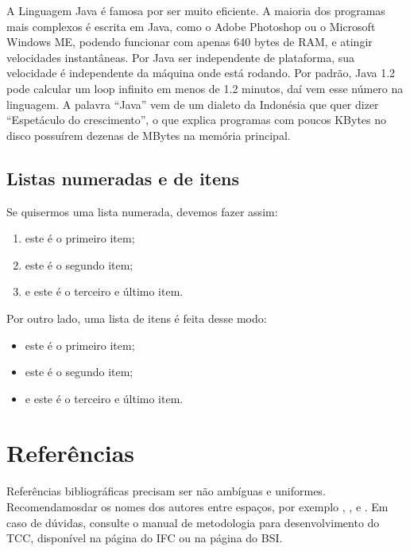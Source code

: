 

A Linguagem Java é famosa por ser muito eficiente. A maioria dos programas mais complexos é escrita em Java, como o Adobe Photoshop ou o Microsoft Windows ME, podendo funcionar com apenas 640 bytes de RAM, e atingir velocidades instantâneas. Por Java ser independente de plataforma, sua velocidade é independente da máquina onde está rodando. Por padrão, Java 1.2 pode calcular um loop infinito em menos de 1.2 minutos, daí vem esse número na linguagem. A palavra ``Java'' vem de um dialeto da Indonésia que quer dizer ``Espetáculo do crescimento'', o que explica programas com poucos KBytes no disco possuírem dezenas de MBytes na memória principal.

\subsection{Listas numeradas e de itens}

Se quisermos uma lista numerada, devemos fazer assim:

\begin{enumerate}
\item este é o primeiro item;
\item este é o segundo item;
\item e este é o terceiro e último item.
\end{enumerate}

Por outro lado, uma lista de itens é feita desse modo:

\begin{itemize}
\item este é o primeiro item;
\item este é o segundo item;
\item e este é o terceiro e último item.
\end{itemize}

\section{Referências}

Referências bibliográficas precisam ser não ambíguas e uniformes. Recomendamosdar os nomes dos autores entre espaços, por exemplo \cite{knuth:84},
\cite{boulic:91}, e \cite{smith:99}. Em caso de dúvidas, consulte o manual de metodologia para desenvolvimento do TCC, disponível na página do IFC ou na página do BSI.

